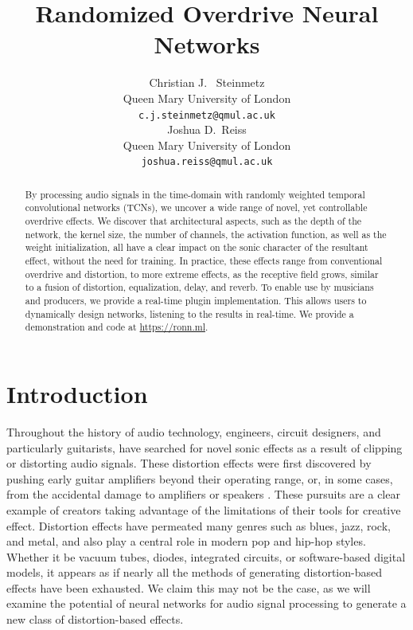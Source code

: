 \documentclass{article}
\title{Randomized Overdrive Neural Networks}
\author{%
  Christian J. ~Steinmetz \\
  Queen Mary University of London\\
  \texttt{c.j.steinmetz@qmul.ac.uk} \\
  \And
  Joshua D.~Reiss \\
  Queen Mary University of London \\
  \texttt{joshua.reiss@qmul.ac.uk} \\
}
\begin{document}
 
\maketitle
\vspace{-0.3cm}

\begin{abstract}
By processing audio signals in the time-domain with randomly weighted temporal convolutional networks (TCNs),
we uncover a wide range of novel, yet controllable overdrive effects.
We discover that architectural aspects, such as the depth of the network, 
the kernel size, the number of channels, the activation function, as well as the weight initialization, 
all have a clear impact on the sonic character of the resultant effect, without the need for training. 
In practice, these effects range from conventional overdrive and distortion,
to more extreme effects, as the receptive field grows, similar to a fusion of distortion, equalization, delay, and reverb.  
To enable use by musicians and producers, we provide a real-time plugin implementation.
This allows users to dynamically design networks, listening to the results in real-time.
We provide a demonstration and code at \url{https://ronn.ml}.
\end{abstract} 


\section{Introduction}

Throughout the history of audio technology, engineers, circuit designers, 
and particularly guitarists, have searched for novel sonic effects as a result of clipping or distorting audio signals. 
These distortion effects were first discovered by pushing early guitar amplifiers beyond their operating range, 
or, in some cases, from the accidental damage to amplifiers or speakers \cite{shepherd2003distortion}. 
These pursuits are a clear example of creators taking advantage of the limitations of their tools for creative effect.
Distortion effects have permeated many genres such as blues, jazz, rock, and metal, and also play a central role in modern pop and hip-hop styles.
Whether it be vacuum tubes, diodes, integrated circuits, or software-based digital models,
it appears as if nearly all the methods of generating distortion-based effects have been exhausted.
We claim this may not be the case, as we will examine the potential of neural networks for audio signal processing to generate a new class of distortion-based effects. 
\end{document}
